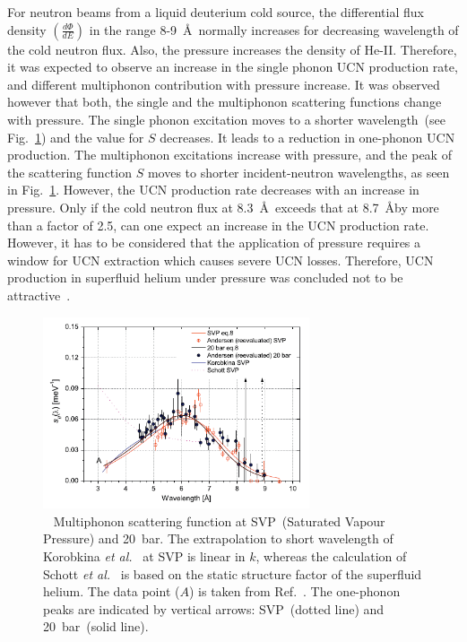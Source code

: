 For neutron beams from a liquid deuterium cold source, the
differential flux density $\left( \frac{d\Phi}{dE} \right)$ in the
range 8-9~\AA~normally increases for decreasing wavelength of the cold
neutron flux. Also, the pressure increases the density of
He-II. Therefore, it was expected to observe an increase in the single
phonon UCN production rate, and different multiphonon contribution
with pressure increase.  It was observed however that both, the single
and the multiphonon scattering functions change with pressure. The
single phonon excitation moves to a shorter wavelength~(see
Fig.~\ref{fig:Schmidt_S}) and the value for $S$ decreases. It leads to
a reduction in one-phonon UCN production. The multiphonon excitations
increase with pressure, and the peak of the scattering function $S$
moves to shorter incident-neutron wavelengths, as seen in
Fig.~\ref{fig:Schmidt_S}. However, the UCN production rate decreases
with an increase in pressure.  Only if the cold neutron flux at
8.3~\AA~exceeds that at 8.7~\AA by more than a factor of 2.5, can one
expect an increase in the UCN production rate.
However, it has to be considered that the application of pressure
requires a window for UCN extraction which causes severe UCN
losses. Therefore, UCN production in superfluid helium under pressure
was concluded not to be attractive~\cite{Schmidt2009}.




\begin{figure}[h!]
\begin{center}
   \includegraphics[width=0.7\textwidth]{Schmidt_S.PNG}
   \caption[Multiphonon scattering function of superfluid helium at
   differnet pressures]{~\cite{Schmidt2009} Multiphonon scattering
     function at SVP~(Saturated Vapour Pressure) and 20~bar. The
     extrapolation to short wavelength of Korobkina {\it {et
         al.}}~\cite{Korobkina2002} at SVP is linear in $k$, whereas
     the calculation of Schott {\it {et al.}}~\cite{Schott2003} is
     based on the static structure factor of the superfluid
     helium. The data point ($A$) is taken from
     Ref.~\cite{Fak1991}. The one-phonon peaks are indicated by
     vertical arrows: SVP~(dotted line) and 20~bar~(solid line).  }
    \label{fig:Schmidt_S}
    \end{center}
\end{figure} 



